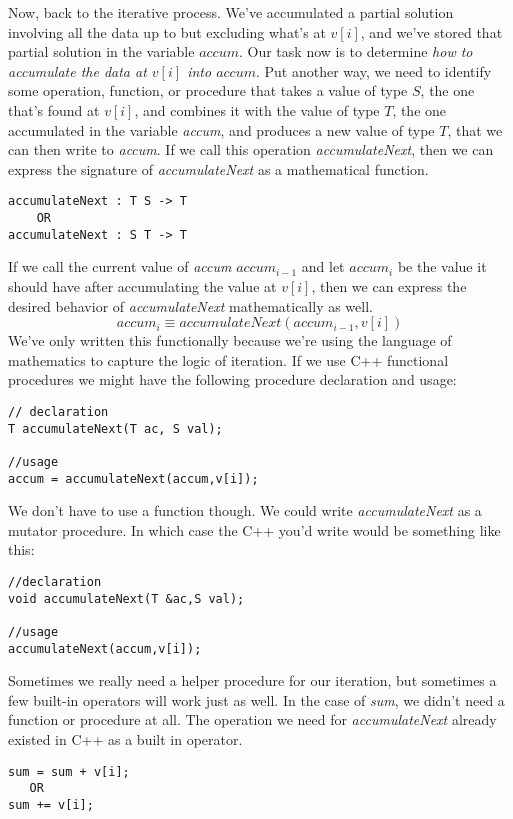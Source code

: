 \documentclass[]{tufte-handout}
\begin{document}
Now, back to the iterative process.  We've accumulated a partial solution involving all the data up to but excluding what's at $v[i]$, and we've stored that partial solution in the variable $accum$. Our task now is to determine \textit{how to accumulate the data at $v[i]$ into $accum$}.  Put another way, we need to identify some operation, function, or procedure that takes a value of type $S$, the one that's found at $v[i]$, and combines it with the value of type $T$, the one accumulated in the variable \textit{accum}, and produces a new value of type $T$, that we can then write to \textit{accum}.  If we call this operation \textit{accumulateNext}, then we can express the signature of \textit{accumulateNext} as a mathematical function.
\begin{verbatim}
accumulateNext : T S -> T
    OR
accumulateNext : S T -> T    
\end{verbatim}
If we call the current value of \textit{accum} $accum_{i-1}$ and let $accum_i$ be the value it should have after accumulating the value at $v[i]$, then we can express the desired behavior of  \textit{accumulateNext} mathematically as well.
\begin{equation*}
accum_i \equiv accumulateNext(accum_{i-1},v[i])
\end{equation*}
We've only written this functionally because we're using the language of mathematics to capture the logic of iteration. If we use C++ functional procedures we might have the following procedure declaration and usage:
\begin{verbatim}
// declaration
T accumulateNext(T ac, S val);

//usage
accum = accumulateNext(accum,v[i]);
\end{verbatim}
We don't have to use a function though. We could write \textit{accumulateNext} as a mutator procedure. In which case the C++ you'd write would be something like this:
\begin{verbatim}
//declaration
void accumulateNext(T &ac,S val);

//usage
accumulateNext(accum,v[i]);
\end{verbatim}

Sometimes we really need a helper procedure for our iteration, but sometimes a few built-in operators will work just as well. In the case of \textit{sum}, we didn't need a function or procedure at all. The operation we need for \textit{accumulateNext} already existed in C++ as a built in operator.
\begin{verbatim}
sum = sum + v[i];
   OR
sum += v[i];
\end{verbatim}
\end{document}
